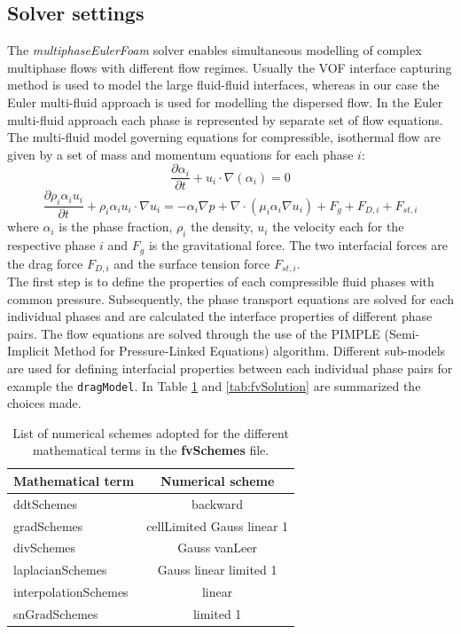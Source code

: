 \documentclass[11pt,a4paper]{article}
\begin{document}
\subsection{Solver settings}
\label{sub:solver}
The \textit{multiphaseEulerFoam} solver enables simultaneous modelling of complex multiphase flows with different flow regimes. Usually the VOF interface capturing method is used to model the large fluid-fluid interfaces, whereas in our case the Euler multi-fluid approach is used for modelling the dispersed flow. In the Euler multi-fluid approach each phase is represented by separate set of flow equations. 
The multi-fluid model governing equations for compressible, isothermal flow are given by a set of mass and momentum equations for each phase $i$:
\begin{equation}
    \frac{\partial \alpha_i}{\partial t}+u_i\cdot \nabla (\alpha_i)=0
\end{equation}
\begin{equation}
    \frac{\partial \rho_i\alpha_iu_i}{\partial t}+\rho_i\alpha_iu_i\cdot \nabla u_i=-\alpha_i\nabla p+\nabla \cdot (\mu_i\alpha_i\nabla u_i)+F_g+F_{D,i}+F_{st,i}
\end{equation}
where $\alpha_i$ is the phase fraction, $\rho_i$ the density, $u_i$ the velocity each for the respective phase $i$ and $F_g$ is the gravitational force. The two interfacial forces are the drag force $F_{D,i}$ and the surface tension force $F_{st,i}$. \\
The first step is to define the properties of each compressible fluid phases with common pressure. Subsequently, the phase transport equations are solved for each individual phases and are calculated the interface properties of different phase pairs. The flow equations are solved through the use of the PIMPLE (Semi-Implicit Method for Pressure-Linked Equations) algorithm. Different sub-models are used for defining interfacial properties between each individual phase pairs for example the \verb!dragModel!. In Table \ref{tab:fvSchemes} and \ref{tab:fvSolution} are summarized the choices made. 
\begin{table}[H]
  \centering
    \begin{tabular}{|p{10em} c|}
    \hline
    \rowcolor{bluePoli!40}
    \textbf{Mathematical term} & \textbf{Numerical scheme}\\
     \hline \hline
    ddtSchemes & backward\\
    gradSchemes & cellLimited Gauss linear 1\\
    divSchemes & Gauss vanLeer\\
    laplacianSchemes & Gauss linear limited 1\\
    interpolationSchemes & linear\\
    snGradSchemes & limited 1\\
    \hline
    \end{tabular}%
  \caption{List of numerical schemes adopted for the different mathematical terms in the \textbf{fvSchemes} file.}
  \label{tab:fvSchemes}%
\end{table}%
\end{document}
